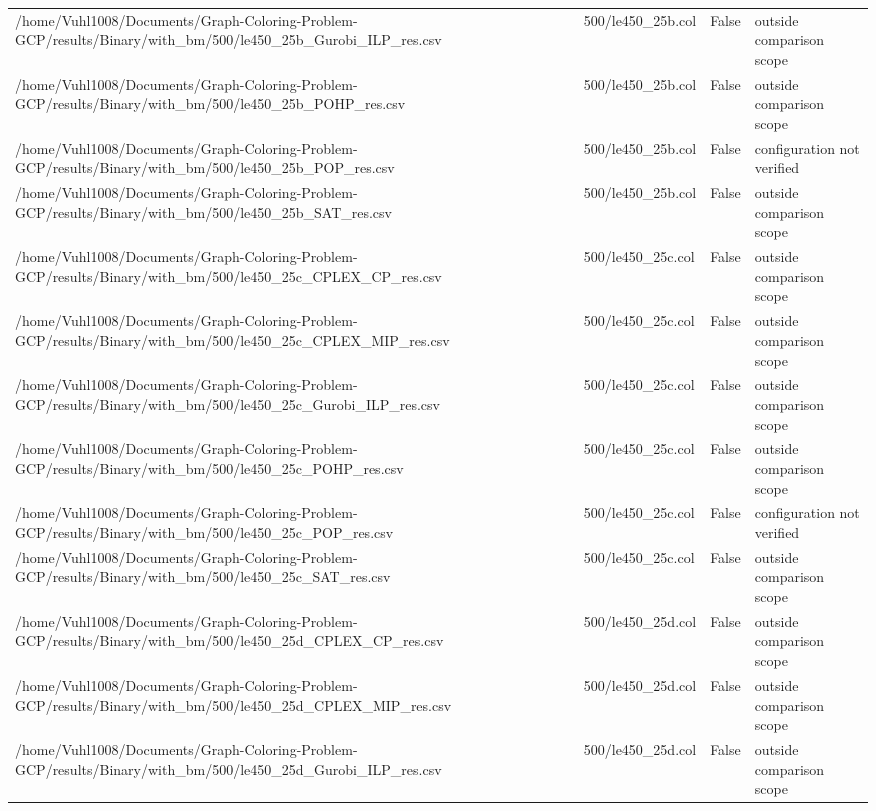 \begin{table}[htbp]
\begin{tabular}{llll}
/home/Vuhl1008/Documents/Graph-Coloring-Problem-GCP/results/Binary/with\_bm/500/le450\_25b\_Gurobi\_ILP\_res.csv & 500/le450\_25b.col & False & outside comparison scope \\
/home/Vuhl1008/Documents/Graph-Coloring-Problem-GCP/results/Binary/with\_bm/500/le450\_25b\_POHP\_res.csv & 500/le450\_25b.col & False & outside comparison scope \\
/home/Vuhl1008/Documents/Graph-Coloring-Problem-GCP/results/Binary/with\_bm/500/le450\_25b\_POP\_res.csv & 500/le450\_25b.col & False & configuration not verified \\
/home/Vuhl1008/Documents/Graph-Coloring-Problem-GCP/results/Binary/with\_bm/500/le450\_25b\_SAT\_res.csv & 500/le450\_25b.col & False & outside comparison scope \\
/home/Vuhl1008/Documents/Graph-Coloring-Problem-GCP/results/Binary/with\_bm/500/le450\_25c\_CPLEX\_CP\_res.csv & 500/le450\_25c.col & False & outside comparison scope \\
/home/Vuhl1008/Documents/Graph-Coloring-Problem-GCP/results/Binary/with\_bm/500/le450\_25c\_CPLEX\_MIP\_res.csv & 500/le450\_25c.col & False & outside comparison scope \\
/home/Vuhl1008/Documents/Graph-Coloring-Problem-GCP/results/Binary/with\_bm/500/le450\_25c\_Gurobi\_ILP\_res.csv & 500/le450\_25c.col & False & outside comparison scope \\
/home/Vuhl1008/Documents/Graph-Coloring-Problem-GCP/results/Binary/with\_bm/500/le450\_25c\_POHP\_res.csv & 500/le450\_25c.col & False & outside comparison scope \\
/home/Vuhl1008/Documents/Graph-Coloring-Problem-GCP/results/Binary/with\_bm/500/le450\_25c\_POP\_res.csv & 500/le450\_25c.col & False & configuration not verified \\
/home/Vuhl1008/Documents/Graph-Coloring-Problem-GCP/results/Binary/with\_bm/500/le450\_25c\_SAT\_res.csv & 500/le450\_25c.col & False & outside comparison scope \\
/home/Vuhl1008/Documents/Graph-Coloring-Problem-GCP/results/Binary/with\_bm/500/le450\_25d\_CPLEX\_CP\_res.csv & 500/le450\_25d.col & False & outside comparison scope \\
/home/Vuhl1008/Documents/Graph-Coloring-Problem-GCP/results/Binary/with\_bm/500/le450\_25d\_CPLEX\_MIP\_res.csv & 500/le450\_25d.col & False & outside comparison scope \\
/home/Vuhl1008/Documents/Graph-Coloring-Problem-GCP/results/Binary/with\_bm/500/le450\_25d\_Gurobi\_ILP\_res.csv & 500/le450\_25d.col & False & outside comparison scope \\

\end{tabular}
\end{table}
